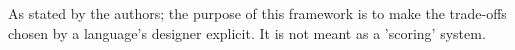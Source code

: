 As stated by the authors; the purpose of this framework is to make the trade-offs chosen by a language's designer explicit. It is not meant as a 'scoring' system.


